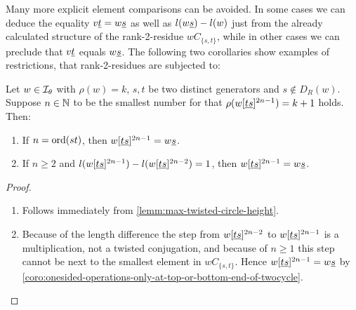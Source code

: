 Many more explicit element comparisons can be avoided. In some cases we can deduce the equality $v \underline{t} = w \underline{s}$ as well as $l(w \underline{s}) - l(w)$ just from the already calculated structure of the rank-2-residue $wC_{\{s,t\}}$, while in other cases we can preclude that $v \underline{t}$ equals $w \underline{s}$. The following two corollaries show examples of restrictions, that rank-2-residues are subjected to:

\begin{coro}
	Let $w \in \mathcal{I}_{\theta}$ with $\rho(w) = k$, $s,t$ be two distinct generators and $s \notin D_R(w)$. Suppose $n \in \mathbb{N}$ to be the smallest number for that $\rho(w[\underline{t} \underline{s}]^{2n-1}) = k + 1$ holds. Then:

	\begin{enumerate}
		\item If $n = \operatorname{ord}(st)$, then $w[\underline{t} \underline{s}]^{2n-1} = w \underline{s}$.
		\item If $n \geq 2$ and $l(w[\underline{t} \underline{s}]^{2n-1}) - l(w[\underline{t} \underline{s}]^{2n-2}) = 1$, then $w[\underline{t} \underline{s}]^{2n-1} = w \underline{s}$.
	\end{enumerate}

	\begin{proof}

		\begin{enumerate}
			\item Follows immediately from \ref{lemm:max-twisted-circle-height}.
			\item Because of the length difference the step from $w[\underline{t} \underline{s}]^{2n-2}$ to $w[\underline{t} \underline{s}]^{2n-1}$ is a multiplication, not a twisted conjugation, and because of $n \geq 1$ this step cannot be next to the smallest element in $wC_{\{s,t\}}$. Hence $w[\underline{t} \underline{s}]^{2n-1} = w \underline{s}$ by \ref{coro:onesided-operations-only-at-top-or-bottom-end-of-twocycle}. \qedhere
		\end{enumerate}
	\end{proof}
\end{coro}

